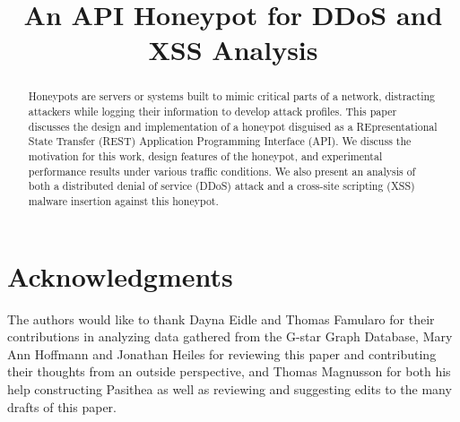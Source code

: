 \documentclass[10pt, conference]{IEEEtran}
\begin{document}
%
\title{An API Honeypot for DDoS and XSS Analysis}


\author{
}


\maketitle


\begin{abstract}
Honeypots are servers or systems built to mimic critical parts of a network, distracting attackers while logging their information to develop attack profiles. 
This paper discusses the design and implementation of a honeypot disguised as a REpresentational State Transfer (REST) Application Programming Interface (API). 
We discuss the motivation for this work, design features of the honeypot, and experimental performance results under various traffic conditions.  
We also present an analysis of both a distributed denial of service (DDoS) attack and a cross-site scripting (XSS) malware insertion against this honeypot.
\end{abstract}








\section*{Acknowledgments} \label{Acknowledgements}
The authors would like to thank Dayna Eidle and Thomas Famularo for their contributions in analyzing data gathered from the G-star Graph Database, Mary Ann Hoffmann and Jonathan Heiles for reviewing this paper and contributing their thoughts from an outside perspective, and Thomas Magnusson for both his help constructing Pasithea as well as reviewing and suggesting edits to the many drafts of this paper.
\end{document}
